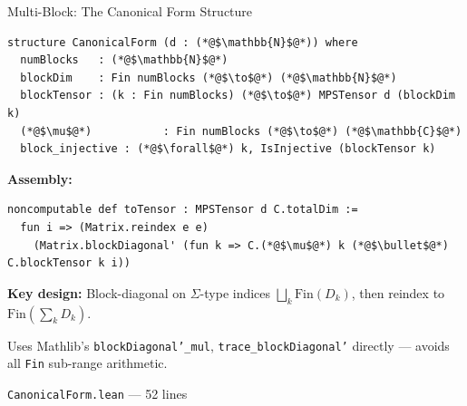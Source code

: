 \documentclass[aspectratio=169,10pt]{beamer}
\begin{document}
\begin{frame}[fragile]{Multi-Block: The Canonical Form Structure}
\vspace{-0.3em}
\begin{lstlisting}[basicstyle=\ttfamily\footnotesize\color{white}]
structure CanonicalForm (d : (*@$\mathbb{N}$@*)) where
  numBlocks   : (*@$\mathbb{N}$@*)
  blockDim    : Fin numBlocks (*@$\to$@*) (*@$\mathbb{N}$@*)
  blockTensor : (k : Fin numBlocks) (*@$\to$@*) MPSTensor d (blockDim k)
  (*@$\mu$@*)           : Fin numBlocks (*@$\to$@*) (*@$\mathbb{C}$@*)
  block_injective : (*@$\forall$@*) k, IsInjective (blockTensor k)
\end{lstlisting}
\vspace{0.1em}
{\small\textbf{Assembly:}}
\begin{lstlisting}[basicstyle=\ttfamily\footnotesize\color{white}]
noncomputable def toTensor : MPSTensor d C.totalDim :=
  fun i => (Matrix.reindex e e)
    (Matrix.blockDiagonal' (fun k => C.(*@$\mu$@*) k (*@$\bullet$@*) C.blockTensor k i))
\end{lstlisting}
\vspace{0.1em}
{\small\textbf{Key design:} Block-diagonal on $\Sigma$-type indices
$\bigsqcup_k \mathrm{Fin}(D_k)$, then reindex to $\mathrm{Fin}(\sum_k D_k)$.}

{\small Uses Mathlib's \texttt{blockDiagonal'\_mul}, \texttt{trace\_blockDiagonal'} directly --- avoids all \texttt{Fin} sub-range arithmetic.}

\vspace{0.2em}
{\small\textcolor{leangreen}{\checkmark}  \texttt{CanonicalForm.lean} --- 52 lines}
\end{frame}
\end{document}
